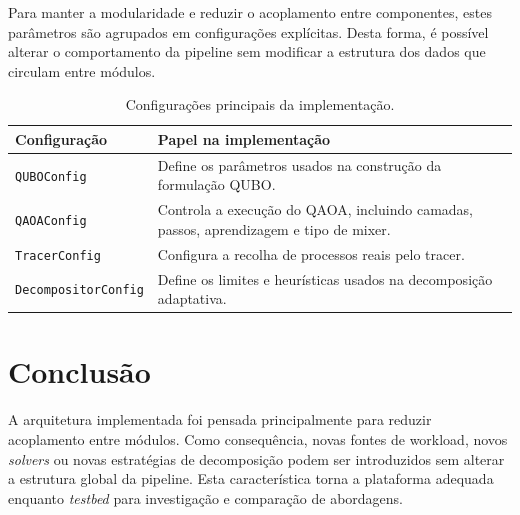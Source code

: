 Para manter a modularidade e reduzir o
acoplamento entre componentes, estes parâmetros são agrupados em configurações
explícitas. Desta forma, é possível alterar o comportamento da pipeline sem
modificar a estrutura dos dados que circulam entre módulos.

\begin{table}[H]
\centering
\small
\begin{tabular}{p{}p{}}
\hline
\textbf{Configuração} & \textbf{Papel na implementação} \\
\hline
\texttt{QUBOConfig} & Define os parâmetros usados na construção da formulação \acs{QUBO}. \\
\texttt{QAOAConfig} & Controla a execução do \acs{QAOA}, incluindo camadas, passos, aprendizagem e tipo de mixer. \\
\texttt{TracerConfig} & Configura a recolha de processos reais pelo tracer. \\
\texttt{DecompositorConfig} & Define os limites e heurísticas usados na decomposição adaptativa. \\
\hline
\end{tabular}
\caption{Configurações principais da implementação.}
\label{tab:configuracoes}
\end{table}

\section{Conclusão}
\label{sec:arquitetura-sintese}

A arquitetura implementada foi pensada principalmente para reduzir acoplamento entre módulos.
Como consequência, novas fontes de workload, novos \textit{solvers} ou novas
estratégias de decomposição podem ser introduzidos sem alterar a estrutura
global da pipeline. Esta característica torna a plataforma adequada enquanto
\textit{testbed} para investigação e comparação de abordagens.
